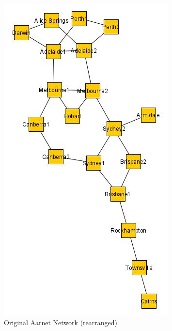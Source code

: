 \documentclass{IEEEtran}
\begin{document}
	\begin{figure}
		\centering
		\begin{subfigure}{0.35\textwidth}
			\includegraphics[width=\linewidth]{Images/Aarnet.jpg}
			\caption{Original Aarnet Network (rearranged)}
			\label{fig:aarnet2009}
		\end{subfigure}
		~
		\begin{subfigure}{0.35\textwidth}

\end{subfigure}
\end{figure}
\end{document}
